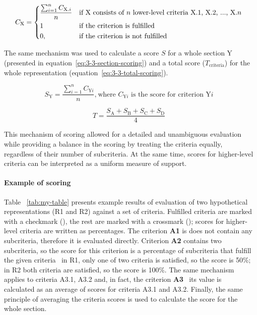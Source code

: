 \begin{equation}
    C_\text{X} =
\begin{dcases}
    \frac{\sum_{i=1}^{n} C_{\text{X.$i$}}}{n} & \text{if X consists of $n$ lower-level criteria X.1, X.2, ..., X.$n$}\\
    1                                       & \text{if the criterion is fulfilled}\\
    0,                                      & \text{if the criterion is not fulfilled}
\end{dcases}
    \label{eq:3-3-criterion-scoring}
\end{equation}

The same mechanism was used to calculate a score $S$ for a whole section Y (presented in equation~\ref{eq:3-3-section-scoring}) and a total score ($T_{\text{criteria}}$) for the whole representation (equation~\ref{eq:3-3-total-scoring}).

\begin{equation}
    S_{\text{Y}} = \frac{\sum_{i=1}^{n} C_{\text{Y$i$}}}{n}\text{,}\ \text{where $C_{\text{Y$i$}}$ is the score for criterion Y$i$}
    \label{eq:3-3-section-scoring}
\end{equation}

\begin{equation}
    T = \frac{S_{\text{A}} + S_{\text{B}} + S_{\text{C}} + S_{\text{D}}}{4}
    \label{eq:3-3-total-scoring}
\end{equation}

This mechanism of scoring allowed for a detailed and unambiguous evaluation while providing a balance in the scoring by treating the criteria equally, regardless of their number of subcriteria.
At the same time, scores for higher-level criteria can be interpreted as a uniform measure of support.

\paragraph{Example of scoring}
Table ~\ref{tab:my-table} presents example results of evaluation of two hypothetical representations (R1 and R2) against a set of criteria.
Fulfilled criteria are marked with a checkmark (\cmark), the rest are marked with a crossmark (\xmark);
scores for higher-level criteria are written as percentages.
The criterion \textbf{A1} is does not contain any subcriteria, therefore it is evaluated directly.
Criterion \textbf{A2} contains two subcriteria, so the score for this criterion is a percentage of subcriteria that fulfill the given criteria \textendash\ in R1, only one of two criteria is satisfied, so the score is 50\%; in R2 both criteria are satisfied, so the score is 100\%.
The same mechanism applies to criteria A3.1, A3.2 and, in fact, the criterion \textbf{A3} \textendash\ its value is calculated as an average of scores for criteria A3.1 and A3.2.
Finally, the same principle of averaging the criteria scores is used to calculate the score for the whole section.

